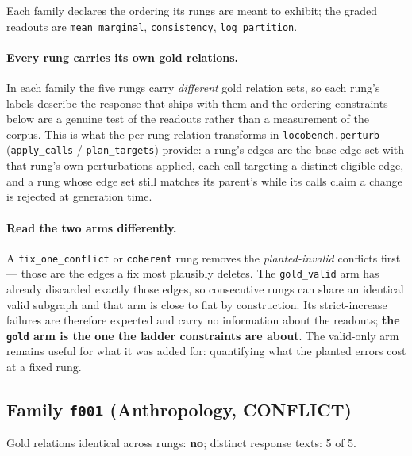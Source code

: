 \documentclass[11pt]{article}
\begin{document}
Each family declares the ordering its rungs are meant to exhibit; the graded readouts are \texttt{mean\_marginal}, \texttt{consistency}, \texttt{log\_partition}.

\paragraph{Every rung carries its own gold relations.} In each family the five rungs carry \emph{different} gold relation sets, so each rung's labels describe the response that ships with them and the ordering constraints below are a genuine test of the readouts rather than a measurement of the corpus. This is what the per-rung relation transforms in \texttt{locobench.perturb} (\texttt{apply\_calls} / \texttt{plan\_targets}) provide: a rung's edges are the base edge set with that rung's own perturbations applied, each call targeting a distinct eligible edge, and a rung whose edge set still matches its parent's while its calls claim a change is rejected at generation time.

\paragraph{Read the two arms differently.} A \texttt{fix\_one\_conflict} or \texttt{coherent} rung removes the \emph{planted-invalid} conflicts first --- those are the edges a fix most plausibly deletes. The \texttt{gold\_valid} arm has already discarded exactly those edges, so consecutive rungs can share an identical valid subgraph and that arm is close to flat by construction. Its strict-increase failures are therefore expected and carry no information about the readouts; \textbf{the \texttt{gold} arm is the one the ladder constraints are about}. The valid-only arm remains useful for what it was added for: quantifying what the planted errors cost at a fixed rung.

\subsection*{Family \texttt{f001} (Anthropology, CONFLICT)}

Gold relations identical across rungs: \textbf{no}; distinct response texts: 5 of 5.
\end{document}
